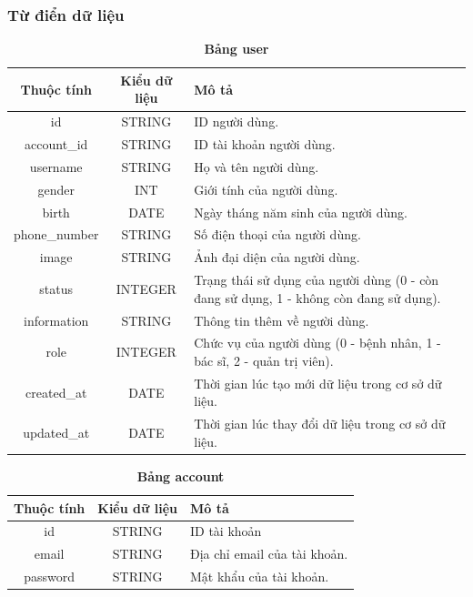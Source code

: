 \subsubsection{Từ điển dữ liệu}

\begin{table}[H]
  \caption{\bfseries \fontsize{12pt}{0pt}\selectfont Bảng user}
  \centering
  \begin{tabularx}{0.9\textwidth}{|c|c|X|}
    \hline
    \textbf{Thuộc tính} & \textbf{Kiểu dữ liệu} & \textbf{Mô tả} \\
    \hline
    id & STRING & ID người dùng.  \\
    \hline
    account\_id & STRING & ID tài khoản người dùng. \\
    \hline
    username & STRING & Họ và tên người dùng. \\
    \hline
    gender & INT & Giới tính của người dùng. \\
    \hline
    birth & DATE & Ngày tháng năm sinh của người dùng. \\
    \hline
    phone\_number & STRING & Số điện thoại của người dùng. \\
    \hline
    image & STRING & Ảnh đại diện của người dùng. \\
    \hline
    status & INTEGER & Trạng thái sử dụng của người dùng (0 - còn đang sử dụng, 1 - không còn đang sử dụng). \\
    \hline
    information & STRING & Thông tin thêm về người dùng. \\
    \hline
    role & INTEGER & Chức vụ của người dùng (0 - bệnh nhân, 1 - bác sĩ, 2 - quản trị viên). \\
    \hline
    created\_at & DATE & Thời gian lúc tạo mới dữ liệu trong cơ sở dữ liệu. \\
    \hline
    updated\_at & DATE & Thời gian lúc thay đổi dữ liệu trong cơ sở dữ liệu. \\
    \hline
    
  \end{tabularx}
\end{table}


\begin{table}[H]
  \caption{\bfseries \fontsize{12pt}{0pt}\selectfont Bảng account}
  \centering
  \begin{tabularx}{0.9\textwidth}{|c|c|X|}
    \hline
    \textbf{Thuộc tính} & \textbf{Kiểu dữ liệu} & \textbf{Mô tả} \\
    \hline
    id & STRING & ID tài khoản  \\
    \hline
    email & STRING & Địa chỉ email của tài khoản. \\
    \hline
    password & STRING & Mật khẩu của tài khoản. \\
    \hline
  \end{tabularx}
\end{table}

